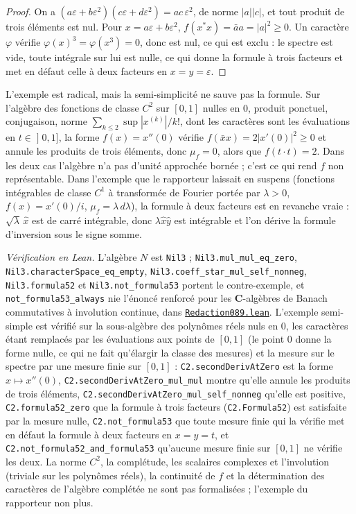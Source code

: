 \begin{proof}
On a $(a\varepsilon + b\varepsilon^2)(c\varepsilon + d\varepsilon^2) = ac\,\varepsilon^2$, de norme $|a||c|$, et tout produit de trois éléments est nul. Pour $x = a\varepsilon + b\varepsilon^2$, $f(x^* x) = \bar a a = |a|^2 \ge 0$. Un caractère $\varphi$ vérifie $\varphi(x)^3 = \varphi(x^3) = 0$, donc est nul, ce qui est exclu : le spectre est vide, toute intégrale sur lui est nulle, ce qui donne la formule à trois facteurs et met en défaut celle à deux facteurs en $x = y = \varepsilon$.
\end{proof}

L'exemple est radical, mais la semi-simplicité ne sauve pas la formule. Sur l'algèbre des fonctions de classe $C^2$ sur $[0,1]$ nulles en $0$, produit ponctuel, conjugaison, norme $\sum_{k \le 2} \sup|x^{(k)}|/k!$, dont les caractères sont les évaluations en $t \in \mathopen]0,1]$, la forme $f(x) = x''(0)$ vérifie $f(\bar x x) = 2|x'(0)|^2 \ge 0$ et annule les produits de trois éléments, donc $\mu_f = 0$, alors que $f(t \cdot t) = 2$. Dans les deux cas l'algèbre n'a pas d'unité approchée bornée ; c'est ce qui rend $f$ non représentable. Dans l'exemple que le rapporteur laissait en suspens (fonctions intégrables de classe $C^1$ à transformée de Fourier portée par $\lambda > 0$, $f(x) = x'(0)/i$, $\mu_f = \lambda\,d\lambda$), la formule à deux facteurs est en revanche vraie : $\sqrt\lambda\,\hat x$ est de carré intégrable, donc $\lambda \hat x \hat y$ est intégrable et l'on dérive la formule d'inversion sous le signe somme.

\begin{sloppypar}
\noindent\emph{Vérification en Lean.} L'algèbre $N$ est \texttt{Nil3} ; \texttt{Nil3.mul\_mul\_eq\_zero}, \texttt{Nil3.characterSpace\_eq\_empty}, \texttt{Nil3.coeff\_star\_mul\_self\_nonneg}, \texttt{Nil3.formula52} et \texttt{Nil3.not\_formula53} portent le contre-exemple, et \texttt{not\_formula53\_always} nie l'énoncé renforcé pour les $\mathbf C$-algèbres de Banach commutatives à involution continue, dans \href{\leanblobmain/Redaction089.lean}{\texttt{Redaction089.\allowbreak{}lean}}. L'exemple semi-simple est vérifié sur la sous-algèbre des polynômes réels nuls en $0$, les caractères étant remplacés par les évaluations aux points de $[0,1]$ (le point $0$ donne la forme nulle, ce qui ne fait qu'élargir la classe des mesures) et la mesure sur le spectre par une mesure finie sur $[0,1]$ : \texttt{C2.secondDerivAtZero} est la forme $x \mapsto x''(0)$, \texttt{C2.secondDerivAtZero\_mul\_mul} montre qu'elle annule les produits de trois éléments, \texttt{C2.secondDerivAtZero\_mul\_self\_nonneg} qu'elle est positive, \texttt{C2.formula52\_zero} que la formule à trois facteurs (\texttt{C2.Formula52}) est satisfaite par la mesure nulle, \texttt{C2.not\_formula53} que toute mesure finie qui la vérifie met en défaut la formule à deux facteurs en $x = y = t$, et \texttt{C2.not\_formula52\_and\_formula53} qu'aucune mesure finie sur $[0,1]$ ne vérifie les deux. La norme $C^2$, la complétude, les scalaires complexes et l'involution (triviale sur les polynômes réels), la continuité de $f$ et la détermination des caractères de l'algèbre complétée ne sont pas formalisées ; l'exemple du rapporteur non plus.
\end{sloppypar}


